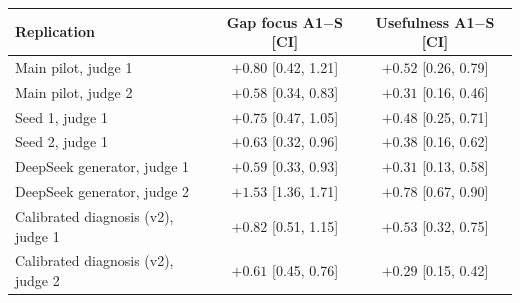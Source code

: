 \begin{tabular}{lcc}
\toprule
Replication & Gap focus A1$-$S [CI] & Usefulness A1$-$S [CI] \\
\midrule
Main pilot, judge 1 & $+0.80$ [0.42, 1.21] & $+0.52$ [0.26, 0.79] \\
Main pilot, judge 2 & $+0.58$ [0.34, 0.83] & $+0.31$ [0.16, 0.46] \\
Seed 1, judge 1 & $+0.75$ [0.47, 1.05] & $+0.48$ [0.25, 0.71] \\
Seed 2, judge 1 & $+0.63$ [0.32, 0.96] & $+0.38$ [0.16, 0.62] \\
DeepSeek generator, judge 1 & $+0.59$ [0.33, 0.93] & $+0.31$ [0.13, 0.58] \\
DeepSeek generator, judge 2 & $+1.53$ [1.36, 1.71] & $+0.78$ [0.67, 0.90] \\
Calibrated diagnosis (v2), judge 1 & $+0.82$ [0.51, 1.15] & $+0.53$ [0.32, 0.75] \\
Calibrated diagnosis (v2), judge 2 & $+0.61$ [0.45, 0.76] & $+0.29$ [0.15, 0.42] \\
\bottomrule
\end{tabular}